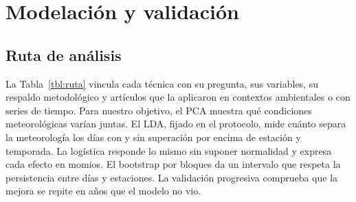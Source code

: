 \section{Modelación y validación}\label{sec:modelacion}

\subsection{Ruta de análisis}\label{sec:ruta}
La Tabla~\ref{tbl:ruta} vincula cada técnica con su pregunta, sus variables, su respaldo metodológico y artículos que la aplicaron en contextos ambientales o con series de tiempo. Para nuestro objetivo, el PCA muestra qué condiciones meteorológicas varían juntas. El LDA, fijado en el protocolo, mide cuánto separa la meteorología los días con y sin superación por encima de estación y temporada. La logística responde lo mismo sin suponer normalidad y expresa cada efecto en momios. El bootstrap por bloques da un intervalo que respeta la persistencia entre días y estaciones. La validación progresiva comprueba que la mejora se repite en años que el modelo no vio.

